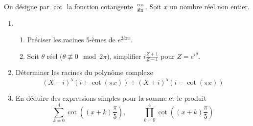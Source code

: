 On d\'{e}signe par $\cot $ la fonction cotangente $\frac{\cos }{\sin }$. Soit $x$ un nombre réel non entier.
\begin{enumerate}
\item
\begin{enumerate}
 \item Préciser les racines 5-èmes de $e^{2i\pi x}$.
 \item Soit $\theta$ réel ($\theta \not \equiv 0 \mod 2\pi$), simplifier $i\frac{Z+1}{Z-1}$ pour $Z=e^{i\theta}$.
\end{enumerate}
 
\item  D\'{e}terminer les racines du polyn\^{o}me complexe 
\begin{displaymath}
(X-i)^{5}(i+\cot (\pi x))+(X+i)^{5}(i-\cot (\pi x))  
\end{displaymath}

\item  En déduire des expressions simples pour la somme et le produit 
\begin{displaymath}
 \sum_{k=0}^{4}\cot ((x+k)\frac{\pi}{5}),\hspace{1cm}
 \prod_{k=0}^{4}\cot ((x+k)\frac{\pi}{5}) 
\end{displaymath}
\end{enumerate}

